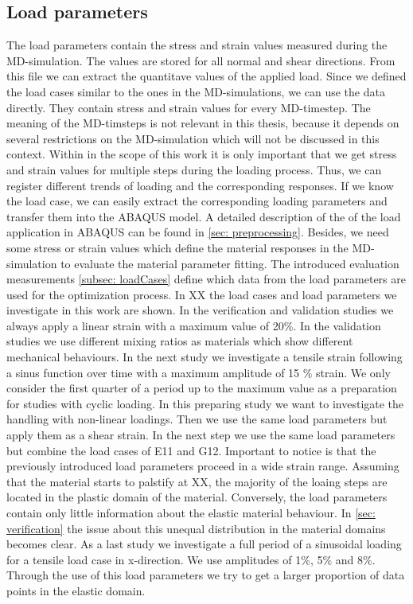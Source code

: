     \subsection{Load parameters}\label{subsec:loadParameters}
    The load parameters contain the stress and strain values measured during the MD-simulation. The values are stored for all normal and shear directions. From this file we can extract the quantitave values of the applied load. Since we defined the load cases similar to the ones in the MD-simulations, we can use the data directly. They contain stress and strain values for every MD-timestep. The meaning of the MD-timsteps is not relevant in this thesis, because it depends on several restrictions on the MD-simulation which will not be discussed in this context. Within in the scope of this work it is only important that we get stress and strain values for multiple steps during the loading process. Thus, we can register different trends of loading and the corresponding responses. If we know the load case, we can easily extract the corresponding loading parameters and transfer them into the ABAQUS model. A detailed description of the of the load application in ABAQUS can be found in \autoref{sec: preprocessing}. Besides, we need some stress or strain values which define the material responses in the MD-simulation to evaluate the material parameter fitting. The introduced evaluation measurements \autoref{subsec: loadCases} define which data from the load parameters are used for the optimization process. In XX the load cases and load parameters we investigate in this work are shown.
    In the verification and validation studies we always apply a linear strain with a maximum value of 20\%. In the validation studies we use different mixing ratios as materials which show different mechanical behaviours. In the next study we investigate a tensile strain following a sinus function over time with a maximum amplitude of 15 \(\%\) strain. We only consider the first quarter of a period up to the maximum value as a preparation for studies with cyclic loading. In this preparing study we want to investigate the handling with non-linear loadings. Then we use the same load parameters but apply them as a shear strain. In the next step we use the same load parameters but combine the load cases of E11 and G12. Important to notice is that the previously introduced load parameters proceed in a wide strain range. Assuming that the material starts to palstify at XX, the majority of the loaing steps are located in the plastic domain of the material. Conversely, the load parameters contain only little information about the elastic material behaviour. In \autoref{sec: verification} the issue about this unequal distribution in the material domains becomes clear.    
    As a last study we investigate  a full period of a sinusoidal loading for a tensile load case in x-direction. We use amplitudes of 1\(\%\), 5\(\%\) and 8\(\%\). Through the use of this load parameters we try to get a larger proportion of data points in the elastic domain.

